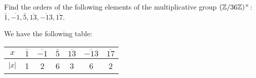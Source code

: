  Find the orders of the following elements of the
multiplicative group $(\mathbb{Z}/36\mathbb{Z})^\times$:
$\bar1, \overline{-1}, \bar5, \overline{13}, \overline{-13},
\overline{17}$.
\begin{solution}
  We have the following table:
  \begin{center}
    \begin{tabular}{c|c|c|c|c|c|c}
      $x$ & $\bar1$ & $\overline{-1}$ & $\bar5$ & $\overline{13}$
      & $\overline{-13}$ & $\overline{17}$ \\\hline
      $\lvert{x}\rvert$ & 1 & 2 & 6 & 3 & 6 & 2
    \end{tabular}
  \end{center}
\end{solution}
